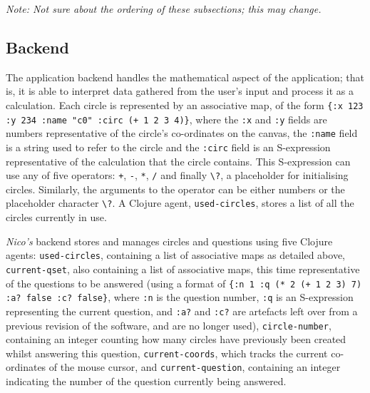 \documentclass[12pt,twoside,notitlepage,xetex]{report}
\begin{document}
\emph{{\sc Note:} Not sure about the ordering of these subsections; this may change.}

\subsection{Backend}

The application backend handles the mathematical aspect of the application;
that is, it is able to interpret data gathered from the user's input and
process it as a calculation.  Each circle is represented by an associative map,
of the form \verb¬{:x 123 :y 234 :name "c0" :circ (+ 1 2 3 4)}¬, where the
\verb¬:x¬ and \verb¬:y¬ fields are numbers representative of the circle's
co-ordinates on the canvas, the \verb¬:name¬ field is a string used to refer to
the circle and the \verb¬:circ¬ field is an S-expression representative of the
calculation that the circle contains.  This S-expression can use any of five
operators: \verb¬+¬, \verb¬-¬, \verb¬*¬, \verb¬/¬ and finally \verb¬\?¬, a
placeholder for initialising circles.  Similarly, the arguments to the operator
can be either numbers or the placeholder character \verb¬\?¬.  A Clojure agent,
\verb¬used-circles¬,  stores a list of all the circles currently in use.

\emph{Nico's} backend stores and manages circles and questions using five
Clojure agents: \verb¬used-circles¬, containing a list of associative maps as
detailed above, \verb¬current-qset¬, also containing a list of associative
maps, this time representative of the questions to be answered (using a format
of \verb¬{:n 1 :q (* 2 (+ 1 2 3) 7) :a? false :c? false}¬, where \verb¬:n¬ is
the question number, \verb¬:q¬ is an S-expression representing the current
question, and \verb¬:a?¬ and \verb¬:c?¬ are artefacts left over from a previous
revision of the software, and are no longer used), \verb¬circle-number¬,
containing an integer counting how many circles have previously been created
whilst answering this question, \verb¬current-coords¬, which tracks the current
co-ordinates of the mouse cursor, and \verb¬current-question¬, containing an
integer indicating the number of the question currently being answered.
\end{document}
